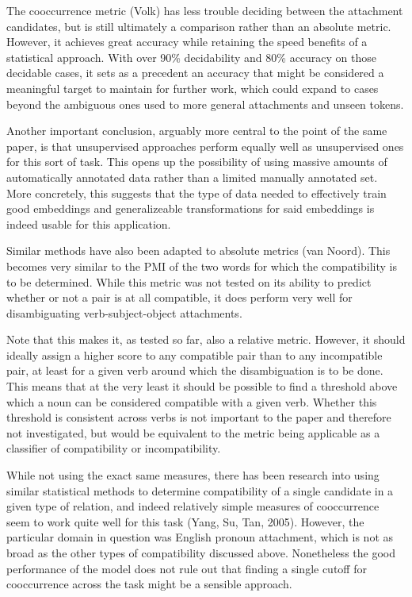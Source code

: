 \documentclass{article}
\begin{document}
The cooccurrence metric (Volk) has less trouble deciding between the attachment candidates, but is still ultimately a comparison rather than an absolute metric. However, it achieves great accuracy while retaining the speed benefits of a statistical approach. With over 90\% decidability and 80\% accuracy on those decidable cases, it sets as a precedent an accuracy that might be considered a meaningful target to maintain for further work, which could expand to cases beyond the ambiguous ones used to more general attachments and unseen tokens.

Another important conclusion, arguably more central to the point of the same paper, is that unsupervised approaches perform equally well as unsupervised ones for this sort of task. This opens up the possibility of using massive amounts of automatically annotated data rather than a limited manually annotated set. More concretely, this suggests that the type of data needed to effectively train good embeddings and generalizeable transformations for said embeddings is indeed usable for this application.

Similar methods have also been adapted to absolute metrics (van Noord). This becomes very similar to the PMI of the two words for which the compatibility is to be determined. While this metric was not tested on its ability to predict whether or not a pair is at all compatible, it does perform very well for disambiguating verb-subject-object attachments.

Note that this makes it, as tested so far, also a relative metric. However, it should ideally assign a higher score to any compatible pair than to any incompatible pair, at least for a given verb around which the disambiguation is to be done. This means that at the very least it should be possible to find a threshold above which a noun can be considered compatible with a given verb. Whether this threshold is consistent across verbs is not important to the paper and therefore not investigated, but would be equivalent to the metric being applicable as a classifier of compatibility or incompatibility.

While not using the exact same measures, there has been research into using similar statistical methods to determine compatibility of a single candidate in a given type of relation, and indeed relatively simple measures of cooccurrence seem to work quite well for this task (Yang, Su, Tan, 2005). However, the particular domain in question was English pronoun attachment, which is not as broad as the other types of compatibility discussed above. Nonetheless the good performance of the model does not rule out that finding a single cutoff for cooccurrence across the task might be a sensible approach.
\end{document}
